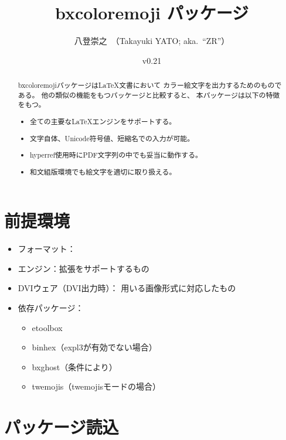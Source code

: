 \documentclass[a4paper]{ltjsarticle}
\newcommand{\PkgVersion}{0.21}
\newcommand{\PkgDate}{2024/08/24}
\newcommand{\Pkg}[1]{\textsf{#1}}
\newcommand{\Means}{：\quad}
\newcommand{\／}{\mbox{}／\mbox{}}
\begin{document}
\title{\Pkg{bxcoloremoji} パッケージ}
\author{八登崇之\ （Takayuki YATO; aka.~“ZR”）}
\date{v\PkgVersion\quad[\PkgDate]}
\maketitle

\begin{abstract}
\Pkg{bxcoloremoji}パッケージは{\LaTeX}文書において
カラー絵文字を出力するためのものである。
他の類似の機能をもつパッケージと比較すると、
本パッケージは以下の特徴をもつ。
\begin{itemize}
\item 全ての主要な{\LaTeX}エンジンをサポートする。
\item 文字自体、Unicode符号値、短縮名での入力が可能。
\item \Pkg{hyperref}使用時にPDF文字列の中でも妥当に動作する。
\item 和文組版環境でも絵文字を適切に取り扱える。
\end{itemize}
\end{abstract}

\tableofcontents


\section{前提環境}
\label{sec:Prerequisites}

\begin{itemize}
\item フォーマット\Means {\LaTeX}
\item エンジン\Means {\eTeX}拡張をサポートするもの
\item DVIウェア（DVI出力時）\Means
  用いる画像形式に対応したもの
\item 依存パッケージ\Means
  \begin{itemize}
  \item \Pkg{etoolbox}
  \item \Pkg{binhex}（expl3が有効でない場合）
  \item \Pkg{bxghost}（条件により）
  \item \Pkg{twemojis}（twemojisモードの場合）
  \end{itemize}
\end{itemize}


\section{パッケージ読込}
\label{sec:Loading}
\end{document}
